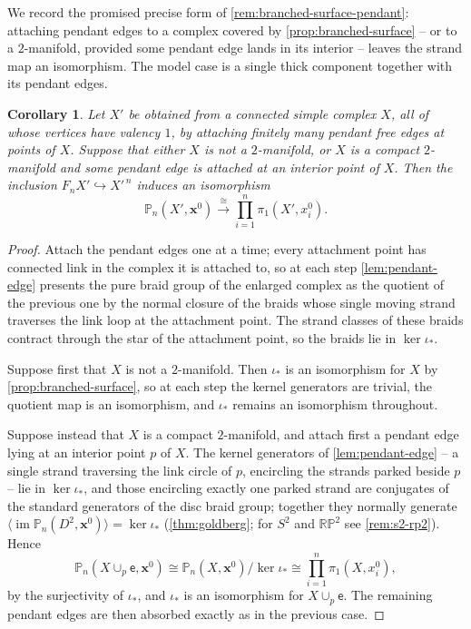 \documentclass[reqno]{amsart}
\newtheorem{corollary}[theorem]{Corollary}
\theoremstyle{definition}
\newcommand\bfx{\mathbf{x}}
\newcommand\sfe{\mathsf{e}}
\newcommand{\PB}{\mathbb{P}}
\newcommand{\im}{\operatorname{im}}
\newcommand{\RP}{\mathbb{RP}}
\newcommand{\co}[1]{\mathopen{\langle}#1\mathclose{\rangle}} %
\newcommand{\base}{\bfx^0}
\numberwithin{equation}{section}
\begin{document}
We record the promised precise form of
\cref{rem:branched-surface-pendant}: attaching pendant edges to
a complex covered by \cref{prop:branched-surface} -- or to a
\(2\)-manifold, provided some pendant edge lands in its interior
-- leaves the strand map an isomorphism. The model case is a
single thick component together with its pendant edges.

\begin{corollary}\label{cor:thick-with-pendants}
Let \(X'\) be obtained from a connected simple complex \(X\),
all of whose vertices have valency \(1\), by attaching finitely
many pendant free edges at points of \(X\). Suppose that either
\(X\) is not a \(2\)-manifold, or \(X\) is a compact
\(2\)-manifold and some pendant edge is attached at an interior
point of \(X\). Then the inclusion
\(F_nX'\hookrightarrow X'^{\,n}\) induces an isomorphism
\[
\PB_n(X',\base)\xrightarrow{\ \cong\ }
\prod_{i=1}^n\pi_1(X',x^0_i).
\]
\end{corollary}

\begin{proof}
Attach the pendant edges one at a time; every attachment point
has connected link in the complex it is attached to, so at each
step \cref{lem:pendant-edge} presents the pure braid group of
the enlarged complex as the quotient of the previous one by the
normal closure of the braids whose single moving strand
traverses the link loop at the attachment point. The strand
classes of these braids contract through the star of the
attachment point, so the braids lie in \(\ker\iota_\ast\).

Suppose first that \(X\) is not a \(2\)-manifold. Then
\(\iota_\ast\) is an isomorphism for \(X\) by
\cref{prop:branched-surface}, so at each step the kernel
generators are trivial, the quotient map is an isomorphism, and
\(\iota_\ast\) remains an isomorphism throughout.

Suppose instead that \(X\) is a compact \(2\)-manifold, and
attach first a pendant edge lying at an interior point \(p\) of
\(X\). The kernel generators of \cref{lem:pendant-edge} -- a
single strand traversing the link circle of \(p\), encircling
the strands parked beside \(p\) -- lie in \(\ker\iota_\ast\),
and those encircling exactly one parked strand are conjugates of
the standard generators of the disc braid group; together they
normally generate
\(\co{\im\PB_n(D^2,\base)}=\ker\iota_\ast\)
(\cref{thm:goldberg}; for \(S^2\) and \(\RP^2\) see
\cref{rem:s2-rp2}). Hence
\[
\PB_n(X\cup_p \sfe,\base)\cong
\PB_n(X,\base)\big/\ker\iota_\ast\cong
\prod_{i=1}^n\pi_1(X,x^0_i),
\]
by the surjectivity of \(\iota_\ast\), and \(\iota_\ast\) is an
isomorphism for \(X\cup_p \sfe\). The remaining pendant edges are
then absorbed exactly as in the previous case.
\end{proof}
\end{document}
